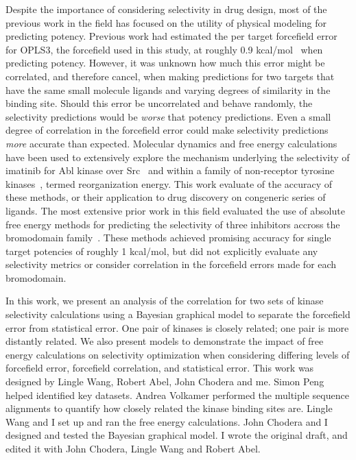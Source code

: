 \documentclass[phd,tocprelim]{cornell}
\begin{document}
Despite the importance of considering selectivity in drug design, most of the previous work in the field has focused on the utility of physical modeling for predicting potency. Previous work had estimated the per target forcefield error for OPLS3, the forcefield used in this study, at roughly 0.9 kcal/mol~\citep{Harder2016-zn} when predicting potency. However, it was unknown how much this error might be correlated, and therefore cancel, when making predictions for two targets that have the same small molecule ligands and varying degrees of similarity in the binding site. Should this error be uncorrelated and behave randomly, the selectivity predictions would be \emph{worse} that potency predictions. Even a small degree of correlation in the forcefield error could make selectivity predictions \emph{more} accurate than expected. Molecular dynamics and free energy calculations have been used to extensively explore the mechanism underlying the selectivity of imatinib for Abl kinase over Src~\citep{Lin2013-ft,Lin2014-iv} and within a family of non-receptor tyrosine kinases~\citep{Lin2013-mu}, termed reorganization energy. This work evaluate of the accuracy of these methods, or their application to drug discovery on congeneric series of ligands. The most extensive prior work in this field evaluated the use of absolute free energy methods for predicting the selectivity of three inhibitors accross the bromodomain family~\citep{Aldeghi2017-ox}. These methods achieved promising accuracy for single target potencies of roughly 1 kcal/mol, but did not explicitly evaluate any selectivity metrics or consider correlation in the forcefield errors made for each bromodomain.  

In this work, we present an analysis of the correlation for two sets of kinase selectivity calculations using a Bayesian graphical model to separate the forcefield error from statistical error. One pair of kinases is closely related; one pair is more distantly related.  We also present models to demonstrate the impact of free energy calculations on selectivity optimization when considering differing levels of forcefield error, forcefield correlation, and statistical error. This work was designed by Lingle Wang, Robert Abel, John Chodera and me. Simon Peng helped identified key datasets. Andrea Volkamer performed the multiple sequence alignments to quantify how closely related the kinase binding sites are. Lingle Wang and I set up and ran the free energy calculations. John Chodera and I designed and tested the Bayesian graphical model. I wrote the original draft, and edited it with John Chodera, Lingle Wang and Robert Abel. 
\end{document}
